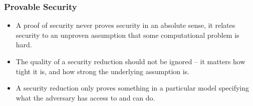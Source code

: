 \begin{frame}\frametitle{Provable Security}
\begin{itemize}
\item A proof of security never proves security in an absolute sense, it relates security to an unproven assumption that some computational problem is hard.
\item The quality of a security reduction should not be ignored -- it matters how tight it is, and how strong the underlying assumption is.
\item A security reduction only proves something in a particular model specifying what the adversary has access to and can do.
\end{itemize}
\end{frame}
